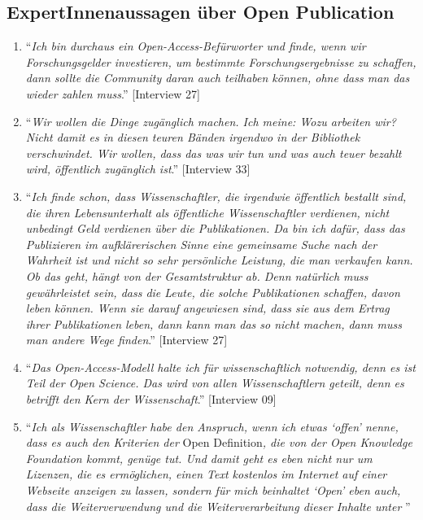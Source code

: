 \documentclass[a4paper,
fontsize=11pt,
oneside,
numbers=noperiodatend,
parskip=half-,
bibliography=totoc,
final
]{scrartcl}
\begin{document}
\subsection{ExpertInnenaussagen über Open
Publication}\label{expertinnenaussagen-uxfcber-open-publication}

\begin{enumerate}
\def\labelenumi{\arabic{enumi}.}
\item
  \enquote{\emph{Ich bin durchaus ein Open-Access-Befürworter und finde,
  wenn wir Forschungsgelder investieren, um bestimmte
  Forschungsergebnisse zu schaffen, dann sollte die Community daran auch
  teilhaben können, ohne dass man das wieder zahlen muss}.} {[}Interview
  27{]}
\item
  \enquote{\emph{Wir wollen die Dinge zugänglich machen. Ich meine: Wozu
  arbeiten wir? Nicht damit es in diesen teuren Bänden irgendwo in der
  Bibliothek verschwindet. Wir wollen, dass das was wir tun und was auch
  teuer bezahlt wird, öffentlich zugänglich ist}.} {[}Interview 33{]}
\item
  \enquote{\emph{Ich finde schon, dass Wissenschaftler, die irgendwie
  öffentlich bestallt sind, die ihren Lebensunterhalt als öffentliche
  Wissenschaftler verdienen, nicht unbedingt Geld verdienen über die
  Publikationen. Da bin ich dafür, dass das Publizieren im
  aufklärerischen Sinne eine gemeinsame Suche nach der Wahrheit ist und
  nicht so sehr persönliche Leistung, die man verkaufen kann. Ob das
  geht, hängt von der Gesamtstruktur ab. Denn natürlich muss
  gewährleistet sein, dass die Leute, die solche Publikationen schaffen,
  davon leben können. Wenn sie darauf angewiesen sind, dass sie aus dem
  Ertrag ihrer Publikationen leben, dann kann man das so nicht machen,
  dann muss man andere Wege finden}.} {[}Interview 27{]}
\item
  \enquote{\emph{Das Open-Access-Modell halte ich für wissenschaftlich
  notwendig, denn es ist Teil der Open Science. Das wird von allen
  Wissenschaftlern geteilt, denn es betrifft den Kern der
  Wissenschaft}.} {[}Interview 09{]}
\item
  \enquote{\emph{Ich als Wissenschaftler habe den Anspruch, wenn ich
  etwas \enquote{offen} nenne, dass es auch den Kriterien der} Open
  Definition\emph{, die von der Open Knowledge Foundation kommt, genüge
  tut. Und damit geht es eben nicht nur um Lizenzen, die es ermöglichen,
  einen Text kostenlos im Internet auf einer Webseite anzeigen zu
  lassen, sondern für mich beinhaltet \enquote{Open} eben auch, dass die
  Weiterverwendung und die Weiterverarbeitung dieser Inhalte unter
}}
\end{enumerate}
\end{document}
